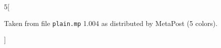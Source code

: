 \vspace{\floatsep}
\begin{multicols}{5}[\noindent\parbox{\textwidth}{%
    \label{tab:spec-plain-mp}%
    \footnotesize Taken from file \texttt{plain.mp} 1.004 as distributed by MetaPost (5 colors).
  }]
  \raggedcolumns
  \setlength{\parindent}{0pt}
  \ttfamily\small\color{mpcolor}
\par
{}\par
{}\par
{}\par
{}\par
\end{multicols}
